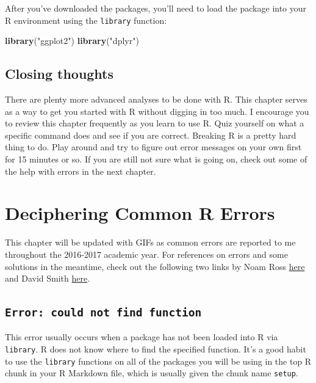 \documentclass[]{tufte-book}
\newenvironment{Shaded}{\begin{snugshade}}{\end{snugshade}}
\newcommand{\KeywordTok}[1]{\textcolor[rgb]{0.13,0.29,0.53}{\textbf{{#1}}}}
\newcommand{\StringTok}[1]{\textcolor[rgb]{0.31,0.60,0.02}{{#1}}}
\newcommand{\NormalTok}[1]{{#1}}
\begin{document}
After you've downloaded the packages, you'll need to load the package
into your R environment using the \texttt{library} function:

\begin{Shaded}
\begin{Highlighting}[]
\KeywordTok{library}\NormalTok{(}\StringTok{"ggplot2"}\NormalTok{)}
\KeywordTok{library}\NormalTok{(}\StringTok{"dplyr"}\NormalTok{)}
\end{Highlighting}
\end{Shaded}

\section{Closing thoughts}\label{closing-thoughts}

There are plenty more advanced analyses to be done with R. This chapter
serves as a way to get you started with R without digging in too much. I
encourage you to review this chapter frequently as you learn to use R.
Quiz yourself on what a specific command does and see if you are
correct. Breaking R is a pretty hard thing to do. Play around and try to
figure out error messages on your own first for 15 minutes or so. If you
are still not sure what is going on, check out some of the help with
errors in the next chapter.

\chapter{Deciphering Common R Errors}\label{errors}

This chapter will be updated with GIFs as common errors are reported to
me throughout the 2016-2017 academic year. For references on errors and
some solutions in the meantime, check out the following two links by
Noam Ross
\href{https://github.com/noamross/zero-dependency-problems/blob/master/misc/stack-overflow-common-r-errors.md}{here}
and David Smith
\href{http://blog.revolutionanalytics.com/2015/03/the-most-common-r-error-messages.html}{here}.

\section{\texorpdfstring{\texttt{Error:\ could\ not\ find\ function}}{Error: could not find function}}\label{error-could-not-find-function}

This error usually occurs when a package has not been loaded into R via
\texttt{library}. R does not know where to find the specified function.
It's a good habit to use the \texttt{library} functions on all of the
packages you will be using in the top R chunk in your R Markdown file,
which is usually given the chunk name \texttt{setup}.
\end{document}
